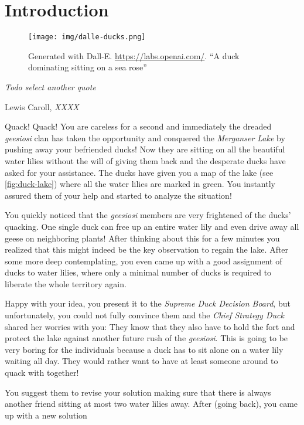 \chapter{Introduction}\label{ch:introduction}

\vspace*{-50pt}

\begin{figure}[ht]
        \texttt{[image: img/dalle-ducks.png]}
        \captionsetup{textformat=empty,labelformat=blank}
        \caption{Generated with Dall-E. \url{https://labs.openai.com/}. ``A duck dominating sitting on a sea rose''}
\end{figure}

\epigraph{\itshape Todo select another quote}{Lewis Caroll, \textit{XXXX}}

Quack! Quack! You are careless for a second and immediately the dreaded \textit{geesiosi} clan has taken the opportunity and conquered the \textit{Merganser Lake} by pushing away your befriended ducks!
Now they are sitting on all the beautiful water lilies without the will of giving them back and the desperate ducks have asked for your assistance.
The ducks have given you a map of the lake (see \cref{fig:duck-lake}) where all the water lilies are marked in green.
You instantly assured them of your help and started to analyze the situation!

You quickly noticed that the \textit{geesiosi} members are very frightened of the ducks' quacking. 
One single duck can free up an entire water lily and even drive away all geese on neighboring plants! After thinking about this for a few minutes you realized that this might indeed be the key observation to regain the lake. 
After some more deep contemplating, you even came up with a good assignment of ducks to water lilies, where only a minimal number of ducks is required to liberate the whole territory again.

Happy with your idea, you present it to the \textit{Supreme Duck Decision Board}, but unfortunately, you could not fully convince them and the \textit{Chief Strategy Duck} shared her worries with you: 
They know that they also have to hold the fort and protect the lake against another future rush of the \textit{geesiosi}.
This is going to be very boring for the individuals because a duck has to sit alone on a water lily waiting all day. They would rather want to have at least someone around to quack with together!

You suggest them to revise your solution making sure that there is always another friend sitting at most two water lilies away. After (going back),  you came up with a new solution

